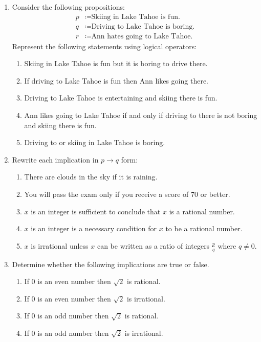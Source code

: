 \documentclass[letterpaper,12pt,fleqn]{article}
\renewcommand{\implies}{\longrightarrow}
\begin{document}
\begin{enumerate}[left=0in,itemsep=0.5in]
\item Consider the following propositions:
  \begin{align*}
    p &\coloneqq\text{Skiing in Lake Tahoe is fun.} \\
    q &\coloneqq\text{Driving to Lake Tahoe is boring.} \\
    r &\coloneqq\text{Ann hates going to Lake Tahoe.}
  \end{align*}
  Represent the following statements using logical operators:
  \begin{enumerate}
  \item Skiing in Lake Tahoe is fun but it is boring to drive there.
  \item If driving to Lake Tahoe is fun then Ann likes going there.
  \item Driving to Lake Tahoe is entertaining and skiing there is fun.
  \item Ann likes going to Lake Tahoe if and only if driving to there is not boring and skiing there is fun.
  \item Driving to or skiing in Lake Tahoe is boring.
  \end{enumerate}

\item Rewrite each implication in \(p\implies q\) form:
  \begin{enumerate}
  \item There are clouds in the sky if it is raining.
  \item You will pass the exam only if you receive a score of \(70\) or better.
  \item \(x\) is an integer is sufficient to conclude that \(x\) is a rational number.
  \item \(x\) is an integer is a necessary condition for \(x\) to be a rational number.
  \item \(x\) is irrational unless \(x\) can be written as a ratio of integers \(\frac{p}{q}\) where \(q\ne0\).
  \end{enumerate}

\item Determine whether the following implications are true or false.
  \begin{enumerate}
  \item If \(0\) is an even number then \(\sqrt{2}\) is rational.
  \item If \(0\) is an even number then \(\sqrt{2}\) is irrational.
  \item If \(0\) is an odd number then \(\sqrt{2}\) is rational.
  \item If \(0\) is an odd number then \(\sqrt{2}\) is irrational.
  \end{enumerate}


\end{enumerate}
\end{document}
